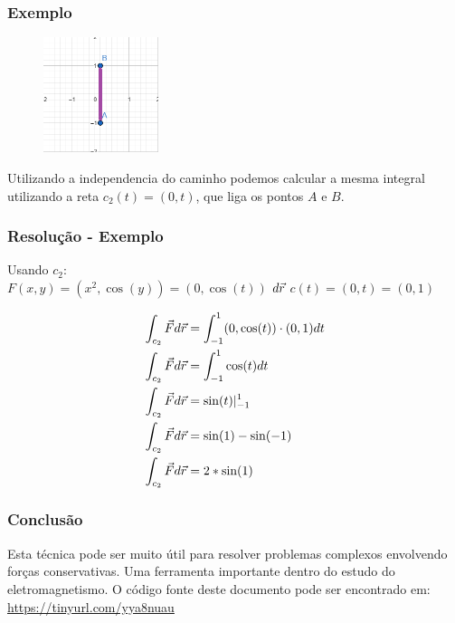 \documentclass{beamer}
\def\vec{\mathaccent "017E\relax }
\begin{document}
\begin{frame}
    \frametitle{Exemplo} 

    \begin{figure} %
        \vspace{-35pt}
        \centering
        \caption{}
        \includegraphics[width=0.30\textwidth]{grafico-exemplo-2.png}
        \label{fig:grafico-exemplo1}
    \end{figure}

    Utilizando a independencia do caminho podemos calcular a mesma integral utilizando 
    a reta $ c_2(t) = ( 0, t) $, que liga os pontos $ A $ e $ B $.

\end{frame}

\begin{frame}
    \frametitle{Resolução - Exemplo} 
    Usando $ c_2 $: \\
    
    $ F(x, y) = ( x^2, \cos(y) ) = ( 0, \cos(t) ) $
    \hfill \break
    $ d\vec{r} $
    \hfill \break
    $ c(t) = ( 0, t ) = ( 0, 1 ) $
    \hfill \break
    
    \begin{align*}   
    \int_{c_2} \vec{F} d\vec{r} &= \int_{-1}^1 (0, \cos(t) ) \cdot ( 0, 1 ) dt \\
    \int_{c_2} \vec{F} d\vec{r} &= \int_{-1}^1 \cos(t) dt  \\
    \int_{c_2} \vec{F} d\vec{r} &= \sin(t)\vert_{-1}^{1} \\
    \int_{c_2} \vec{F} d\vec{r} &= \sin(1) - \sin(-1) \\
    \int_{c_2} \vec{F} d\vec{r} &= 2 * \sin(1) \\
    \end{align*}
    
\end{frame}

\begin{frame}
    \frametitle{Conclusão} 
    Esta técnica pode ser muito útil para resolver problemas complexos envolvendo forças conservativas. 
    Uma ferramenta importante dentro do estudo do eletromagnetismo.
    \hfill \break
    \hfill \break
    O código fonte deste documento pode ser encontrado em:
    \hfill \break
    \url{https://tinyurl.com/yya8nuau}

\end{frame}
\end{document}
